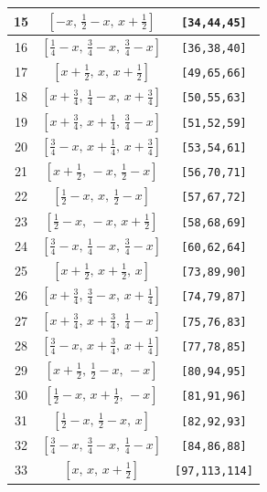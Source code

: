 \documentclass[fleqn,8pt]{jsarticle}
\begin{document}
\begin{longtable}{ccc}
15 & $\left[ - x,\, \frac{1}{2} - x,\, x + \frac{1}{2} \right]$ & {\tt [34,44,45]} \\ \hline
16 & $\left[ \frac{1}{4} - x,\, \frac{3}{4} - x,\, \frac{3}{4} - x \right]$ & {\tt [36,38,40]} \\ \hline
17 & $\left[ x + \frac{1}{2},\, x,\, x + \frac{1}{2} \right]$ & {\tt [49,65,66]} \\ \hline
18 & $\left[ x + \frac{3}{4},\, \frac{1}{4} - x,\, x + \frac{3}{4} \right]$ & {\tt [50,55,63]} \\ \hline
19 & $\left[ x + \frac{3}{4},\, x + \frac{1}{4},\, \frac{3}{4} - x \right]$ & {\tt [51,52,59]} \\ \hline
20 & $\left[ \frac{3}{4} - x,\, x + \frac{1}{4},\, x + \frac{3}{4} \right]$ & {\tt [53,54,61]} \\ \hline
21 & $\left[ x + \frac{1}{2},\, - x,\, \frac{1}{2} - x \right]$ & {\tt [56,70,71]} \\ \hline
22 & $\left[ \frac{1}{2} - x,\, x,\, \frac{1}{2} - x \right]$ & {\tt [57,67,72]} \\ \hline
23 & $\left[ \frac{1}{2} - x,\, - x,\, x + \frac{1}{2} \right]$ & {\tt [58,68,69]} \\ \hline
24 & $\left[ \frac{3}{4} - x,\, \frac{1}{4} - x,\, \frac{3}{4} - x \right]$ & {\tt [60,62,64]} \\ \hline
25 & $\left[ x + \frac{1}{2},\, x + \frac{1}{2},\, x \right]$ & {\tt [73,89,90]} \\ \hline
26 & $\left[ x + \frac{3}{4},\, \frac{3}{4} - x,\, x + \frac{1}{4} \right]$ & {\tt [74,79,87]} \\ \hline
27 & $\left[ x + \frac{3}{4},\, x + \frac{3}{4},\, \frac{1}{4} - x \right]$ & {\tt [75,76,83]} \\ \hline
28 & $\left[ \frac{3}{4} - x,\, x + \frac{3}{4},\, x + \frac{1}{4} \right]$ & {\tt [77,78,85]} \\ \hline
29 & $\left[ x + \frac{1}{2},\, \frac{1}{2} - x,\, - x \right]$ & {\tt [80,94,95]} \\ \hline
30 & $\left[ \frac{1}{2} - x,\, x + \frac{1}{2},\, - x \right]$ & {\tt [81,91,96]} \\ \hline
31 & $\left[ \frac{1}{2} - x,\, \frac{1}{2} - x,\, x \right]$ & {\tt [82,92,93]} \\ \hline
32 & $\left[ \frac{3}{4} - x,\, \frac{3}{4} - x,\, \frac{1}{4} - x \right]$ & {\tt [84,86,88]} \\ \hline
33 & $\left[ x,\, x,\, x + \frac{1}{2} \right]$ & {\tt [97,113,114]} \\ \hline

\end{longtable}
\end{document}
